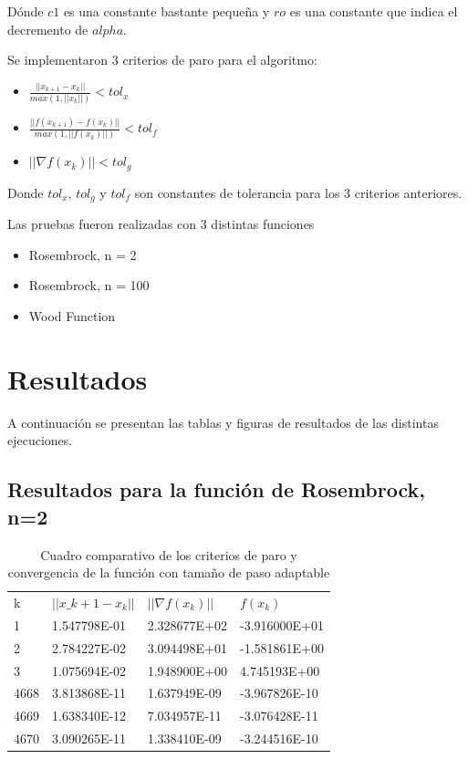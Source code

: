 \documentclass[journal]{IEEEtran}
\begin{document}
Dónde $c1$ es una constante bastante pequeña y $ro$ es una constante que indica el decremento de $alpha$.

Se implementaron 3 criterios de paro para el algoritmo:

\begin{itemize}
    \item $ \frac{||x_{k+1}- x_k||}{max(1, ||x_k||)} < tol_x $
    \item $ \frac{||f(x_{k+1}) - f(x_k)||}{max(1, ||f(x_k)||)} < tol_f $
    \item $||\nabla f(x_k)|| < tol_g$
\end{itemize}

Donde $tol_x$, $tol_g$ y $tol_f$ son constantes de tolerancia para los 3 criterios anteriores.

Las pruebas fueron realizadas con 3 distintas funciones

\begin{itemize}
    \item Rosembrock, n = 2
    \item Rosembrock, n = 100
    \item Wood Function
\end{itemize}

\section{Resultados}

A continuación se presentan las tablas y figuras de resultados de las distintas ejecuciones.

\subsection{Resultados para la función de Rosembrock, n=2}

\begin{table}[H]
\begin{tabular}{@{}llll@{}}
k & $||x\_{k+1}-x_k||$ & $||\nabla f(x_k)||$ & $f(x_k)$ \\
1  &  1.547798E-01 &  2.328677E+02   &  -3.916000E+01  \\
2  &  2.784227E-02 &  3.094498E+01   &  -1.581861E+00  \\
3  &  1.075694E-02 &  1.948900E+00   &  4.745193E+00  \\
4668  &  3.813868E-11 &  1.637949E-09   &  -3.967826E-10 \\
4669  &  1.638340E-12 &  7.034957E-11   &  -3.076428E-11  \\
4670  &  3.090265E-11 &  1.338410E-09   &  -3.244516E-10
\end{tabular}
\caption{Cuadro comparativo de los criterios de paro y convergencia de la función con tamaño de paso adaptable}
\end{table}
\end{document}
